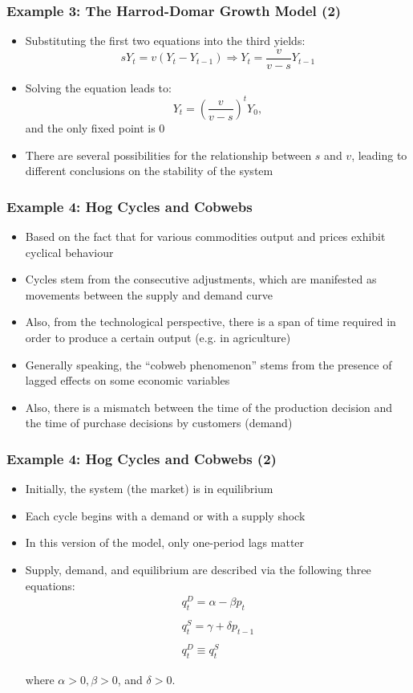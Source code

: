 \documentclass[10pt,usenames,dvipsnames]{beamer}
\theoremstyle{plain}
\theoremstyle{definition}
\begin{document}
\begin{frame}[fragile]
\frametitle{Example 3: The Harrod-Domar Growth Model (2)}
\begin{itemize}
	\item Substituting the first two equations into the third yields:
	\[
		sY_{t} = v(Y_{t} - Y_{t-1}) \Rightarrow Y_{t} = \frac{v}{v-s}Y_{t-1}
	\]
	\item Solving the equation leads to:
	\[
		Y_{t} = \left(\frac{v}{v-s}\right)^{t}Y_{0},
	\]
	and the only fixed point is 0
	\item There are several possibilities for the relationship between $s$ and $v$, leading to different conclusions on the stability of the system
\end{itemize}
\end{frame}

\begin{frame}[fragile]
\frametitle{Example 4: Hog Cycles and Cobwebs}
\begin{itemize}
	\item Based on the fact that for various commodities output and prices exhibit cyclical behaviour  
	\item Cycles stem from the consecutive adjustments, which are manifested as movements between the supply and demand curve
	\item Also, from the technological perspective, there is a span of time required in order to produce a certain output (e.g. in agriculture)
	\item Generally speaking, the ``cobweb phenomenon'' stems from the presence of lagged effects on some economic variables
	\item Also, there is a mismatch between the time of the production decision and the time of purchase decisions by customers (demand)
\end{itemize}
\end{frame}

\begin{frame}[fragile]
\frametitle{Example 4: Hog Cycles and Cobwebs (2)}
\begin{itemize}
	\item Initially, the system (the market) is in equilibrium
	\item Each cycle begins with a demand or with a supply shock
	\item In this version of the model, only one-period lags matter
	\item Supply, demand, and equilibrium are described via the following three equations:
	\[
	\begin{array}{lcl}
		q_{t}^{D} = \alpha - \beta p_{t}\\
		\quad\\
		q_{t}^{S} = \gamma + \delta p_{t-1}\\
		\quad\\
		q_{t}^{D} \equiv q_{t}^{S}
	\end{array}
	\]
	
	where $\alpha > 0, \beta > 0$, and $\delta > 0$.
\end{itemize}
\end{frame}
\end{document}
